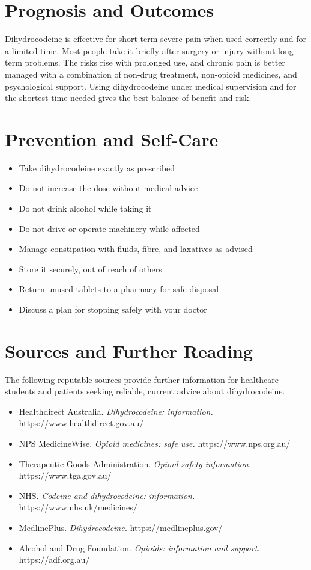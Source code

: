 \section*{Prognosis and Outcomes}
Dihydrocodeine is effective for short-term severe pain when used correctly and for a limited time. Most people take it briefly after surgery or injury without long-term problems. The risks rise with prolonged use, and chronic pain is better managed with a combination of non-drug treatment, non-opioid medicines, and psychological support. Using dihydrocodeine under medical supervision and for the shortest time needed gives the best balance of benefit and risk.

\section*{Prevention and Self-Care}
\begin{itemize}
    \item Take dihydrocodeine exactly as prescribed
    \item Do not increase the dose without medical advice
    \item Do not drink alcohol while taking it
    \item Do not drive or operate machinery while affected
    \item Manage constipation with fluids, fibre, and laxatives as advised
    \item Store it securely, out of reach of others
    \item Return unused tablets to a pharmacy for safe disposal
    \item Discuss a plan for stopping safely with your doctor
\end{itemize}

\section*{Sources and Further Reading}
The following reputable sources provide further information for healthcare students and patients seeking reliable, current advice about dihydrocodeine.

\begin{itemize}
    \item Healthdirect Australia. \textit{Dihydrocodeine: information.} https://www.healthdirect.gov.au/
    \item NPS MedicineWise. \textit{Opioid medicines: safe use.} https://www.nps.org.au/
    \item Therapeutic Goods Administration. \textit{Opioid safety information.} https://www.tga.gov.au/
    \item NHS. \textit{Codeine and dihydrocodeine: information.} https://www.nhs.uk/medicines/
    \item MedlinePlus. \textit{Dihydrocodeine.} https://medlineplus.gov/
    \item Alcohol and Drug Foundation. \textit{Opioids: information and support.} https://adf.org.au/
\end{itemize}
